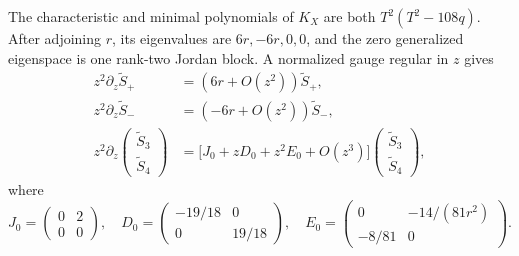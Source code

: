 \begin{proposition}
\label{prop:cubic-block-data}
%
%
%
The characteristic and minimal polynomials of \(K_X\) are both
\(T^2(T^2-108q)\).  After adjoining \(r\), its eigenvalues are
\(6r,-6r,0,0\), and the zero generalized eigenspace is one rank-two Jordan
block.  A normalized gauge regular in \(z\) gives
\begin{equation}
 \begin{aligned}
 z^2\partial_z\widetilde S_+&=(6r+O(z^2))\widetilde S_+,\\
 z^2\partial_z\widetilde S_-&=(-6r+O(z^2))\widetilde S_-,\\
 z^2\partial_z
 \begin{pmatrix}\widetilde S_3\\\widetilde S_4\end{pmatrix}
 &=\bigl[J_0+zD_0+z^2E_0+O(z^3)\bigr]
 \begin{pmatrix}\widetilde S_3\\\widetilde S_4\end{pmatrix},
 \end{aligned}
 \label{eq:cubic-integral-block-reduction}
\end{equation}
where
\begin{equation}
 J_0=\begin{pmatrix}0&2\\0&0\end{pmatrix},\quad
 D_0=\begin{pmatrix}-19/18&0\\0&19/18\end{pmatrix},\quad
 E_0=\begin{pmatrix}0&-14/(81r^2)\\-8/81&0\end{pmatrix}.
 \label{eq:cubic-shared-block-data}
\end{equation}
\end{proposition}

